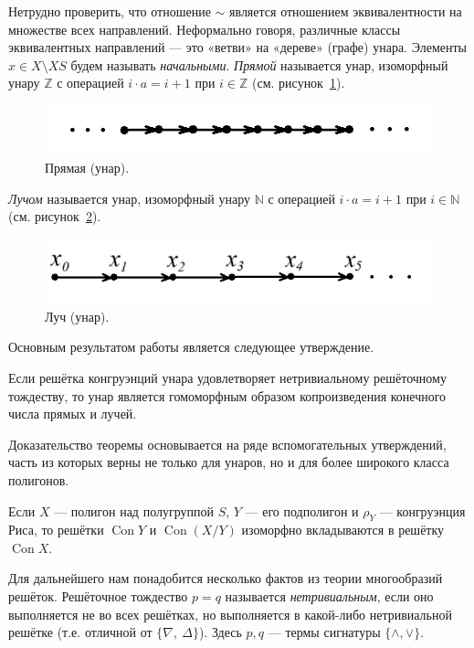 \documentclass[11pt,twoside,draft
]{article}
\def\Con{\operatorname{Con}}
\begin{document}
Нетрудно проверить, что отношение $\sim$ является отношением эквивалентности на множестве всех направлений.
Неформально говоря, различные классы эквивалентных направлений — это «ветви» на «дереве» (графе) унара.
Элементы $x \in X \setminus XS$ будем называть \textit{начальными}.
\textit{Прямой} называется унар, изоморфный унару $\mathbb{Z}$ с операцией $i \cdot a = i + 1$ при $i \in \mathbb{Z}$ (см. рисунок~\ref{fig:line}).
\begin{figure}[ht!]
	\centering
	\includegraphics[scale=1]{img/line.png}
	\caption{Прямая (унар).}
	\label{fig:line}
\end{figure}

\textit{Лучом} называется унар, изоморфный унару $\mathbb{N}$ с операцией $i \cdot a = i + 1$ при $i \in \mathbb{N}$ (см. рисунок~\ref{fig:ray}).
\begin{figure}[ht!]
	\centering
	\includegraphics[scale=1]{img/ray.png}
	\caption{Луч (унар).}
	\label{fig:ray}
\end{figure}

Основным результатом работы является следующее утверждение.

\begin{theorem} \label{thm:main}
	Если решётка конгруэнций унара удовлетворяет нетривиальному решёточному тождеству, то унар является гомоморфным образом копроизведения конечного числа прямых и лучей.
\end{theorem}

Доказательство теоремы основывается на ряде вспомогательных утверждений, часть из которых верны не только для унаров, но и для более широкого класса полигонов.

\begin{lemma} \label{lemma:1}
	Если $X$ — полигон над полугруппой $S$, $Y$ — его подполигон и $\rho_Y$ — конгруэнция Риса, то решётки $\Con Y$ и $\Con (X/Y)$ изоморфно вкладываются в решётку $\Con X$.
\end{lemma}

Для дальнейшего нам понадобится несколько фактов из теории многообразий решёток.
Решёточное тождество $p = q$ называется \textit{нетривиальным}, если оно выполняется не во всех решётках, но выполняется в какой-либо нетривиальной решётке (т.е. отличной от $\{\nabla,\ \Delta\}$).
Здесь $p,q$ — термы сигнатуры $\{ \land , \lor \}$.
\end{document}
